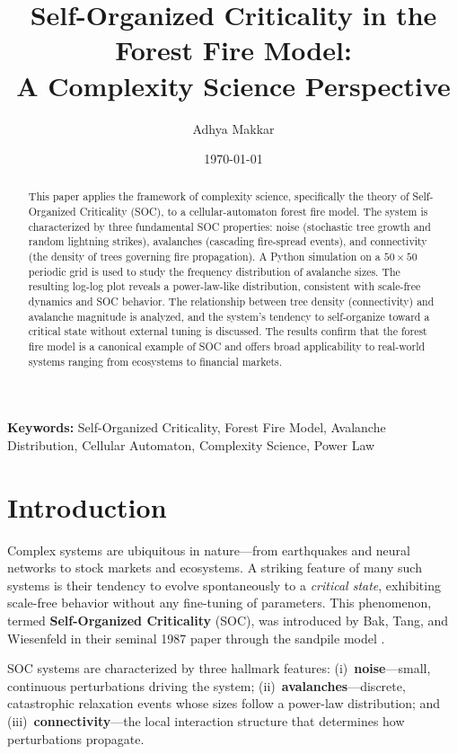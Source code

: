\documentclass[12pt, a4paper]{article}
\title{\textbf{Self-Organized Criticality in the Forest Fire Model:\\
A Complexity Science Perspective}}
\author{Adhya Makkar}
\affil[1]{Department of Chemical Engineering, IIT Delhi\\
Entry Number: 2021CH70028}
\date{\today}
\begin{document}
\maketitle
\thispagestyle{empty}

\begin{abstract}
\noindent
This paper applies the framework of complexity science, specifically the theory of
Self-Organized Criticality (SOC), to a cellular-automaton forest fire model. The
system is characterized by three fundamental SOC properties: noise (stochastic tree
growth and random lightning strikes), avalanches (cascading fire-spread events), and
connectivity (the density of trees governing fire propagation). A Python simulation
on a $50 \times 50$ periodic grid is used to study the frequency distribution of
avalanche sizes. The resulting log-log plot reveals a power-law-like distribution,
consistent with scale-free dynamics and SOC behavior. The relationship between tree
density (connectivity) and avalanche magnitude is analyzed, and the system's
tendency to self-organize toward a critical state without external tuning is
discussed. The results confirm that the forest fire model is a canonical example of
SOC and offers broad applicability to real-world systems ranging from ecosystems to
financial markets.
\end{abstract}

\vspace{0.5em}
\noindent\textbf{Keywords:} Self-Organized Criticality, Forest Fire Model, Avalanche
Distribution, Cellular Automaton, Complexity Science, Power Law

\newpage
\tableofcontents
\newpage

\section{Introduction}
\label{sec:intro}

Complex systems are ubiquitous in nature—from earthquakes and neural networks to
stock markets and ecosystems. A striking feature of many such systems is their
tendency to evolve spontaneously to a \emph{critical state}, exhibiting scale-free
behavior without any fine-tuning of parameters. This phenomenon, termed
\textbf{Self-Organized Criticality} (SOC), was introduced by Bak, Tang, and
Wiesenfeld in their seminal 1987 paper through the sandpile model
\cite{bak1987self}.

SOC systems are characterized by three hallmark features: (i)~\textbf{noise}—small,
continuous perturbations driving the system; (ii)~\textbf{avalanches}—discrete,
catastrophic relaxation events whose sizes follow a power-law distribution; and
(iii)~\textbf{connectivity}—the local interaction structure that determines how
perturbations propagate.
\end{document}
